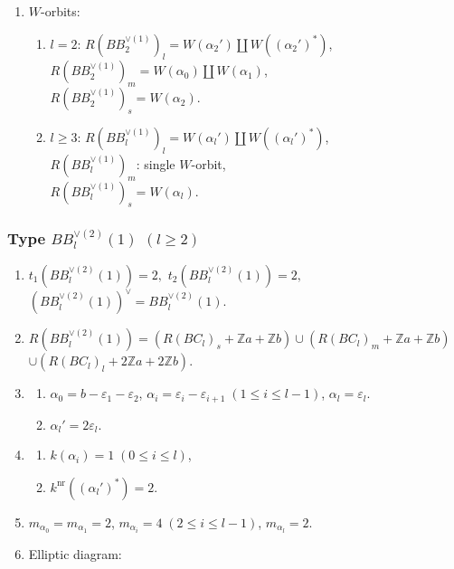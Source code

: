 \documentclass[11pt]{amsart}
\newcommand{\Z}{\mathbb{Z}}
\newcommand{\nr}{\mathrm{nr}}
\newcommand{\vep}{\varepsilon}
\begin{document}
{\begin{enumerate}
\begin{center}
{\begin{tikzpicture}[scale=0.85]
\end{tikzpicture}}
\end{center}
\item $W$-orbits:
\begin{enumerate}
\item[i)] $l=2$: $R(BB_2^{\vee (1)})_l=W(\alpha_2') \amalg W((\alpha_2')^\ast)$, 
\\ 
\phantom{$l=2$:} $R(BB_2^{\vee (1)})_m=W(\alpha_0) \amalg W(\alpha_1)$, \\
\phantom{$l=2$:} $R(BB_2^{\vee (1)})_s=W(\alpha_2)$.
\item[ii)] $l\geq 3$: $R(BB_l^{\vee (1)})_l=W(\alpha_l') \amalg W((\alpha_l')^\ast)$, \\
\phantom{$l\geq 3$:} $R(BB_l^{\vee (1)})_m$: single $W$-orbit, \\
\phantom{$l\geq 3$:} $R(BB_l^{\vee (1)})_s=W(\alpha_l)$.
\end{enumerate}
\end{enumerate}

\subsubsection{Type $BB_l^{\vee (2)}(1)$ $(l\geq 2)$}\label{data:BB-2}
\begin{enumerate}
\item $t_1(BB_l^{\vee (2)}(1))=2,$ \quad $t_2(BB_l^{\vee (2)}(1))=2,$ \quad $(BB_l^{\vee (2)}(1))^\vee = BB_l^{\vee (2)}(1).$
\item $R(BB_l^{\vee (2)}(1))=(R(BC_l)_s+\Z a+\Z b) \cup (R(BC_l)_m+\Z a+\Z b)$ \\
 $\cup (R(BC_l)_l+2\Z a+2\Z b)$. 
\item 
\begin{enumerate}
\item[i)] $\alpha_0=b-\vep_1-\vep_2$, $\alpha_i=\vep_i-\vep_{i+1}\; 
(1\leq i \leq l-1)$, $\alpha_l=\vep_l$. 
\item[ii)] $\alpha_l'=2\vep_l$.
\end{enumerate}
\item 
\begin{enumerate}
\item[i)] $k(\alpha_i)=1\; (0\leq i\leq l)$, 
\item[ii)] $k^{\nr}((\alpha_l')^\ast)=2$. 
\end{enumerate}
\item $m_{\alpha_0}=m_{\alpha_1}=2$, \; $m_{\alpha_i}=4\; 
(2\leq i\leq l-1)$, \;  $m_{\alpha_l}=2$.
\item Elliptic diagram:





\end{enumerate}}
\end{document}
